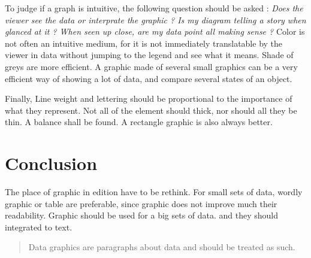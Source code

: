To judge if a graph is intuitive, the following question should be asked : \emph{Does the viewer see the data or interprate the graphic ? Is my diagram telling a story when glanced at it ? When seen up close, are my data point all making sense ?}
 Color is not often an intuitive medium, for it is not immediately translatable by the viewer in data without jumping to the legend and see what it means. Shade of greys are more efficient. A graphic made of several small graphics can be a very efficient way of showing a lot of data, and compare several states of an object.

Finally, Line weight and lettering should be proportional to the importance of what they represent. Not all of the element should thick, nor should all they be thin. A balance shall be found. A rectangle graphic is also always better.
\section{Conclusion}

The place of graphic in edition have to be rethink. For small sets of data, wordly graphic or table are preferable, since graphic does not improve much their readability. Graphic should be used for a big sets of data. and they should integrated to text. 
\begin{quote}
Data graphics are paragraphs about data and should be treated as such.
\end{quote}
